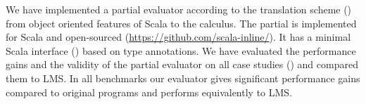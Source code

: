 We have implemented a partial evaluator according to the translation scheme ()
 from object oriented features of Scala to the \calculus calculus. The partial is
 implemented for Scala and open-sourced (\url{https://github.com/scala-inline/}).
 It has a minimal Scala interface () based on type annotations.
 We have evaluated the performance gains and the validity of the partial evaluator
 on all case studies () and compared them to LMS. In all benchmarks
 our evaluator gives significant performance gains compared to original programs and
 performs equivalently to LMS.
